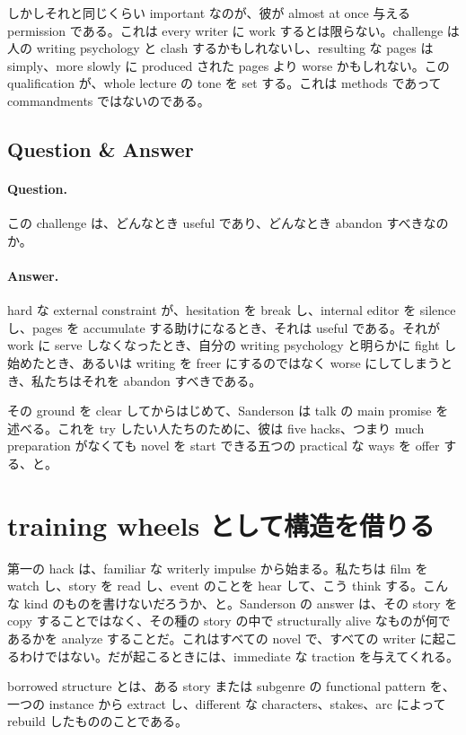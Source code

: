 しかしそれと同じくらい important なのが、彼が almost at once 与える permission である。これは every writer に work するとは限らない。challenge は人の writing psychology と clash するかもしれないし、resulting な pages は simply、more slowly に produced された pages より worse かもしれない。この qualification が、whole lecture の tone を set する。これは methods であって commandments ではないのである。

\subsection{Question \& Answer}

\paragraph{Question.} この challenge は、どんなとき useful であり、どんなとき abandon すべきなのか。

\paragraph{Answer.} hard な external constraint が、hesitation を break し、internal editor を silence し、pages を accumulate する助けになるとき、それは useful である。それが work に serve しなくなったとき、自分の writing psychology と明らかに fight し始めたとき、あるいは writing を freer にするのではなく worse にしてしまうとき、私たちはそれを abandon すべきである。

その ground を clear してからはじめて、Sanderson は talk の main promise を述べる。これを try したい人たちのために、彼は five hacks、つまり much preparation がなくても novel を start できる五つの practical な ways を offer する、と。

\section{training wheels として構造を借りる}

第一の hack は、familiar な writerly impulse から始まる。私たちは film を watch し、story を read し、event のことを hear して、こう think する。こんな kind のものを書けないだろうか、と。Sanderson の answer は、その story を copy することではなく、その種の story の中で structurally alive なものが何であるかを analyze することだ。これはすべての novel で、すべての writer に起こるわけではない。だが起こるときには、immediate な traction を与えてくれる。

\begin{definition}
borrowed structure とは、ある story または subgenre の functional pattern を、一つの instance から extract し、different な characters、stakes、arc によって rebuild したもののことである。
\end{definition}

